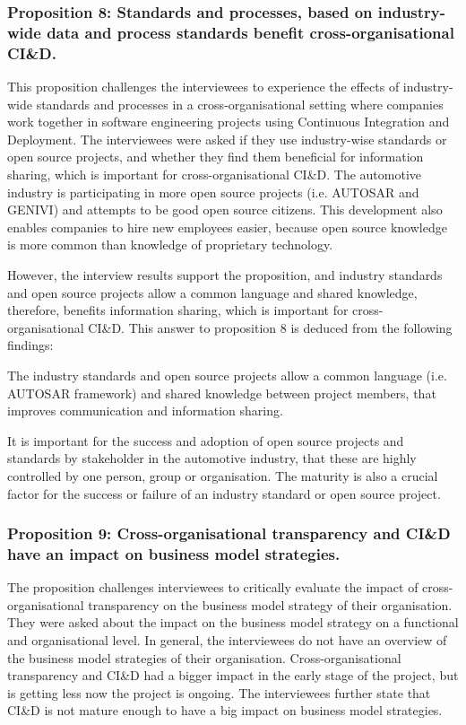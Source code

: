 \subsubsection{Proposition 8: Standards and processes, based on industry-wide data and process standards benefit cross-organisational CI\&D.}

This proposition challenges the interviewees to experience the effects of industry-wide standards and processes in a cross-organisational setting where companies work together in software engineering projects using Continuous Integration and Deployment. The interviewees were asked if they use industry-wise standards or open source projects, and whether they find them beneficial for information sharing, which is important for cross-organisational CI\&D. The automotive industry is participating in more open source projects (i.e. AUTOSAR and GENIVI) and attempts to be good open source citizens. This development also enables companies to hire new employees easier, because open source knowledge is more common than knowledge of proprietary technology.

However, the interview results support the proposition, and industry standards and open source projects allow a common language and shared knowledge, therefore, benefits information sharing, which is important for cross-organisational CI\&D. This answer to proposition 8 is deduced from the following findings:

 The industry standards and open source projects allow a common language (i.e. AUTOSAR framework) and shared knowledge between project members, that improves communication and information sharing.

 It is important for the success and adoption of open source projects and standards by stakeholder in the automotive industry, that these are highly controlled by one person, group or organisation. The maturity is also a crucial factor for the success or failure of an industry standard or open source project.

\subsubsection{Proposition 9: Cross-organisational transparency and CI\&D have an impact on business model strategies.}

The proposition challenges interviewees to critically evaluate the impact of cross-organisational transparency on the business model strategy of their organisation. They were asked about the impact on the business model strategy on a functional and organisational level. In general, the interviewees do not have an overview of the business model strategies of their organisation. Cross-organisational transparency and CI\&D had a bigger impact in the early stage of the project, but is getting less now the project is ongoing. The interviewees further state that CI\&D is not mature enough to have a big impact on business model strategies. 

